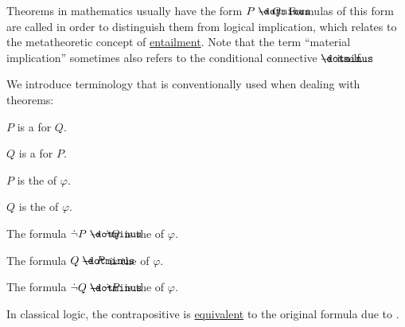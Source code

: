\begin{definition}\label{def:material_implication}
  Theorems in mathematics usually have the form \( P \synimplies Q \). Formulas of this form are called  in order to distinguish them from logical implication, which relates to the metatheoretic concept of \hyperref[def:propositional_semantics/entailment]{entailment}. Note that the term \enquote{material implication} sometimes also refers to the conditional connective \hyperref[def:propositional_language/connectives/conditional]{\( \synimplies \)} itself.

  We introduce terminology that is conventionally used when dealing with theorems:

  \begin{thmenum}
     \( P \) is a  for \( Q \).

     \( Q \) is a  for \( P \).

     \( P \) is the  of \( \varphi \).

     \( Q \) is the  of \( \varphi \).

     The formula \( \synneg P \synimplies \synneg Q \) is the  of \( \varphi \).

     The formula \( Q \synimplies P \) is the  of \( \varphi \).

     The formula \( \synneg Q \synimplies \synneg P \) is the  of \( \varphi \).
  \end{thmenum}
\end{definition}
\begin{comments}
  \item  In classical logic, the contrapositive is \hyperref[def:propositional_semantics/equivalence]{equivalent} to the original formula due to .
\end{comments}

